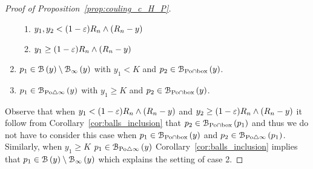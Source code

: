 \begin{proof}[Proof of Proposition~\ref{prop:couling_c_H_P}]
\begin{enumerate}
\begin{enumerate}
\item $y_1,y_2 < (1-\eps ) R_n \wedge (R_n-y)$
\item $y_1 \ge (1-\eps ) R_n \wedge (R_n-y)$
\end{enumerate}
\item$p_1 \in \BallHyp{y} \setminus \BallPo{y}$ with $y_1 < K$ and $p_2 \in \BallInter{y}$.
\item $p_1 \in \BallSym{y}$ with $y_1 \ge K$ and $p_2 \in \BallInter{y}$.
\end{enumerate}
Observe that when $y_1 < (1-\eps ) R_n \wedge (R_n-y)$ and $y_2 \ge (1-\eps ) R_n \wedge (R_n-y)$ it follow from Corollary~\ref{cor:balls_inclusion} that $p_2 \in \BallInter{p_1}$ and thus we do not have to consider this case when $p_1 \in \BallInter{y}$ and $p_2 \in \BallSym{p_1}$. Similarly, when $y_1 \ge K$ $p_1 \in \BallSym{y}$ Corollary~\ref{cor:balls_inclusion} implies that $p_1 \in \BallHyp{y} \setminus \BallPo{y}$ which explains the setting of case 2.


\end{proof}
